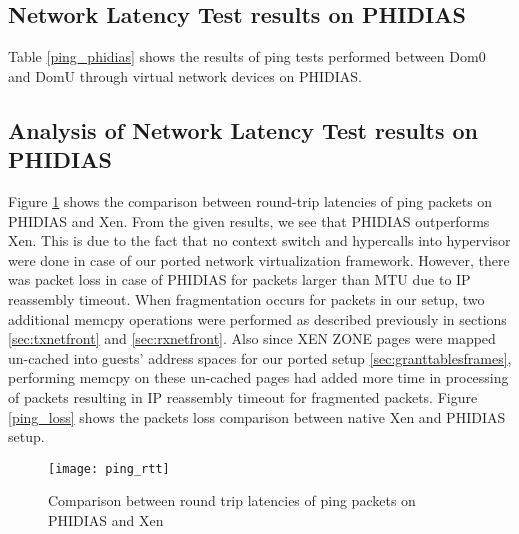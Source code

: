 \subsection{Network Latency Test results on PHIDIAS \label{sec:testlatencyphidias}}
Table \ref{ping_phidias} shows the results of ping tests performed between Dom0 and DomU through virtual network devices on PHIDIAS.

\begin{table}[htbp]
	\caption{Ping Test Results on PHIDIAS}
	 \centering
	\label{ping_phidias}
\end{table}

\subsection{Analysis of Network Latency Test results on PHIDIAS \label{sec:testlatencyeval}}

Figure \ref{ping_rtt} shows the comparison between round-trip latencies of ping packets on PHIDIAS and Xen. From the given results, we see that PHIDIAS outperforms Xen. This is due to the fact that no context switch and hypercalls into hypervisor were done in case of our ported network virtualization framework. However, there was packet loss in case of PHIDIAS for packets larger than MTU due to IP reassembly timeout. When fragmentation occurs for packets in our setup, two additional memcpy operations were performed as described previously in sections \ref{sec:txnetfront} and \ref{sec:rxnetfront}. Also since XEN ZONE pages were mapped un-cached into guests' address spaces for our ported setup \ref{sec:granttablesframes}, performing memcpy on these un-cached pages had added more time in processing of packets resulting in IP reassembly timeout for fragmented packets. Figure \ref{ping_loss} shows the packets loss comparison between native Xen and PHIDIAS setup.
\begin{figure}[!htbp]
	\centering
	\texttt{[image: ping\_rtt]}
	\caption{Comparison between round trip latencies of ping packets on PHIDIAS and Xen}
	\label{ping_rtt}
\end{figure}

